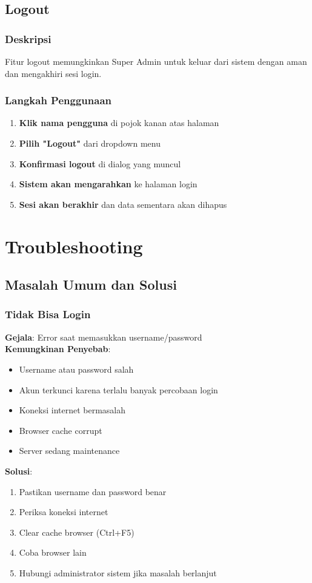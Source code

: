\documentclass[12pt,a4paper]{article}
\begin{document}
\subsection{Logout}

\subsubsection{Deskripsi}
Fitur logout memungkinkan Super Admin untuk keluar dari sistem dengan aman dan mengakhiri sesi login.

\subsubsection{Langkah Penggunaan}
\begin{enumerate}
\item \textbf{Klik nama pengguna} di pojok kanan atas halaman
\item \textbf{Pilih "Logout"} dari dropdown menu
\item \textbf{Konfirmasi logout} di dialog yang muncul
\item \textbf{Sistem akan mengarahkan} ke halaman login
\item \textbf{Sesi akan berakhir} dan data sementara akan dihapus
\end{enumerate}

\section{Troubleshooting}

\subsection{Masalah Umum dan Solusi}

\subsubsection{Tidak Bisa Login}
\textbf{Gejala}: Error saat memasukkan username/password\\
\textbf{Kemungkinan Penyebab}:
\begin{itemize}
\item Username atau password salah
\item Akun terkunci karena terlalu banyak percobaan login
\item Koneksi internet bermasalah
\item Browser cache corrupt
\item Server sedang maintenance
\end{itemize}
\textbf{Solusi}:
\begin{enumerate}
\item Pastikan username dan password benar
\item Periksa koneksi internet
\item Clear cache browser (Ctrl+F5)
\item Coba browser lain
\item Hubungi administrator sistem jika masalah berlanjut
\end{enumerate}
\end{document}
